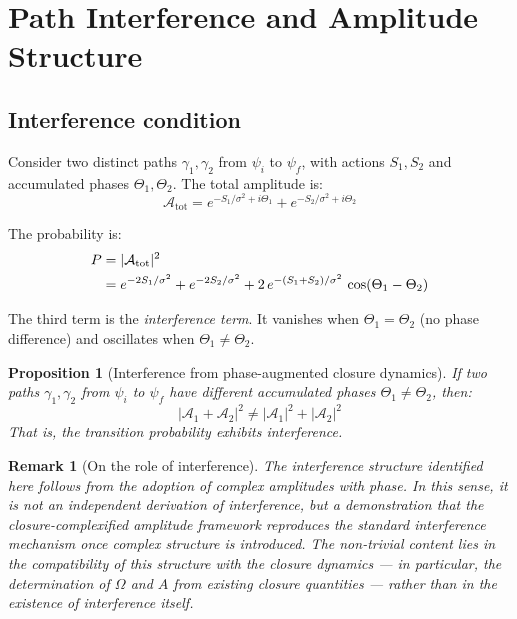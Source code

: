 \documentclass[12pt]{article}
\newtheorem{proposition}[theorem]{Proposition}
\newtheorem{remark}[theorem]{Remark}
\begin{document}
\section{Path Interference and Amplitude Structure}\label{sec:interference}

\subsection{Interference condition}

Consider two distinct paths $\gamma_1, \gamma_2$ from $\psi_i$ to $\psi_f$, with actions $S_1, S_2$ and accumulated phases $\Theta_1, \Theta_2$. The total amplitude is:
\begin{equation}
    \mathcal{A}_{\mathrm{tot}} = e^{-S_1/\sigma^2 + i\Theta_1} + e^{-S_2/\sigma^2 + i\Theta_2}
\end{equation}

The probability is:
\begin{align}\label{eq:interference}
    P &= |\mathcal{A}_{\mathrm{tot}}|^2 \notag \\
    &= e^{-2S_1/\sigma^2} + e^{-2S_2/\sigma^2} + 2\, e^{-(S_1+S_2)/\sigma^2}\, \cos(\Theta_1 - \Theta_2)
\end{align}

The third term is the \textit{interference term}. It vanishes when $\Theta_1 = \Theta_2$ (no phase difference) and oscillates when $\Theta_1 \neq \Theta_2$.

\begin{proposition}[Interference from phase-augmented closure dynamics]\label{prop:interference}
If two paths $\gamma_1, \gamma_2$ from $\psi_i$ to $\psi_f$ have different accumulated phases $\Theta_1 \neq \Theta_2$, then:
\begin{equation}
    |\mathcal{A}_1 + \mathcal{A}_2|^2 \neq |\mathcal{A}_1|^2 + |\mathcal{A}_2|^2
\end{equation}
That is, the transition probability exhibits interference.
\end{proposition}

\begin{remark}[On the role of interference]
The interference structure identified here follows from the adoption of complex amplitudes with phase. In this sense, it is not an independent derivation of interference, but a demonstration that the closure-complexified amplitude framework reproduces the standard interference mechanism once complex structure is introduced. The non-trivial content lies in the compatibility of this structure with the closure dynamics --- in particular, the determination of $\Omega$ and $A$ from existing closure quantities --- rather than in the existence of interference itself.
\end{remark}
\end{document}
